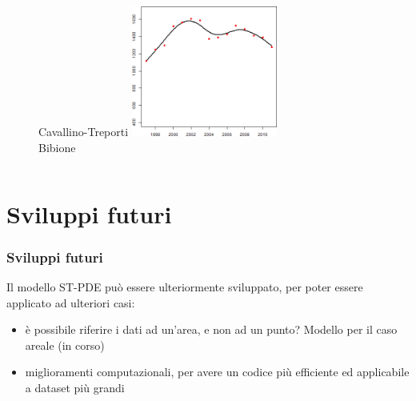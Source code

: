 \documentclass[landscape,9pt]{beamer}                           %
\begin{document}
\begin{frame}
\begin{columns}
\begin{column}{0.45\textwidth}
\begin{figure}
\begin{multicols}{2}
	Cavallino-Treporti
	\includegraphics[width=0.45\textwidth]{Immagini/VeneziaCovar/Bibione.png}\\
	Bibione
	\end{multicols}
	\end{figure}
	\end{column}
	
	\begin{column}{0.35\textwidth}	
		\begin{flushleft}		
		\end{flushleft}
	\end{column}
\end{columns}
\end{frame}

\section{Sviluppi futuri}
\begin{frame}
\frametitle{Sviluppi futuri}
Il modello ST-PDE può essere ulteriormente sviluppato, per poter essere applicato ad ulteriori casi:
\begin{itemize}
\item<2-> è possibile riferire i dati ad un'area, e non ad un punto? Modello per il caso areale (in corso)
\item<3-> miglioramenti computazionali, per avere un codice più efficiente ed applicabile a dataset più grandi
\end{itemize}

\end{frame}
\end{document}

